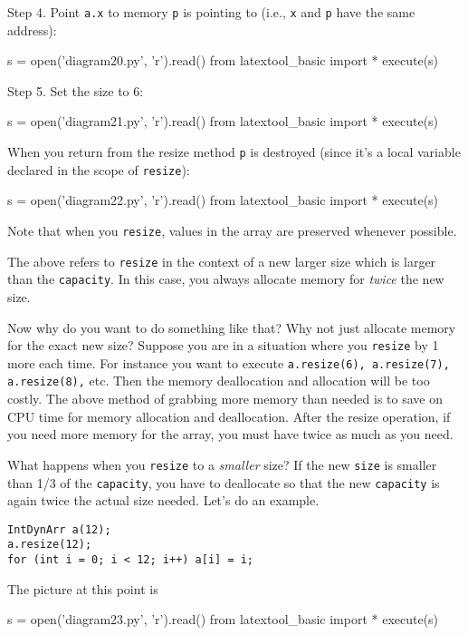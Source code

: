 Step 4.
Point \verb!a.x! to memory \verb!p! is pointing to (i.e., \verb!x! and \verb!p! 
have the same address): 
\begin{python}
s = open('diagram20.py', 'r').read()
from latextool_basic import *
execute(s)
\end{python}

Step 5.
Set the size to 6:
\begin{python}
s = open('diagram21.py', 'r').read()
from latextool_basic import *
execute(s)
\end{python}

When you return from the resize method \verb!p! is destroyed (since
it's a local variable declared in the scope of \verb!resize!):
\begin{python}
s = open('diagram22.py', 'r').read()
from latextool_basic import *
execute(s)
\end{python}

Note that when you \verb!resize!, values in the array are preserved whenever 
possible.

The above refers to \verb!resize! in the context of a new larger size which 
is larger than the \verb!capacity!.
In this case, you always allocate memory for \textit{twice} the new size.

Now why do you want to do something like that? Why not just allocate memory for the 
exact new size? Suppose you are in a situation where you \verb!resize! by 1 more each time. 
For instance you want to execute \verb!a.resize(6), a.resize(7), a.resize(8),! etc. 
Then the memory deallocation and allocation will be too costly. The above method of 
grabbing more memory than needed is to save on CPU time for memory allocation and deallocation. 
After the resize operation, if you need more memory for the array, you must have twice 
as much as you need.

What happens when you \verb!resize! to a \textit{smaller} size? If 
the new \verb!size! is smaller than 1/3 of the \verb!capacity!, you have to deallocate 
so that the new \verb!capacity! is again twice the actual size needed. Let's do an example.

\begin{Verbatim}[frame=single]
IntDynArr a(12);
a.resize(12);  
for (int i = 0; i < 12; i++) a[i] = i;
\end{Verbatim}

The picture at this point is
\begin{python}
s = open('diagram23.py', 'r').read()
from latextool_basic import *
execute(s)
\end{python}

